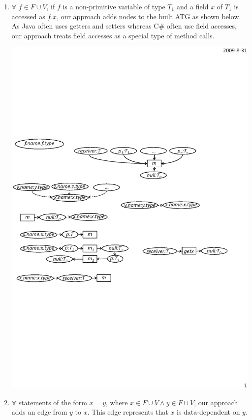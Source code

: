 \begin{enumerate}
\item $\forall$ $f\in F \cup V$, if $f$ is a non-primitive variable
of type $T_1$ and a field $x$ of $T_1$ is accessed as $f.x$, our
approach adds nodes to the built ATG as shown below. As Java often
uses getters and setters whereas C\# often use field accesses, our
approach treats field accesses as a special type of method
calls.\vspace*{-2ex}

\begin{center}
\includegraphics[scale=0.7,clip]{figure/rule3.eps}%
\end{center}\vspace*{-3ex}

\item $\forall$ statements of the form $x = y$, where $x \in F \cup V \wedge y \in F \cup V$,
our approach adds an edge from $y$ to $x$. This edge represents that
$x$ is data-dependent on $y$.\vspace*{-1.5ex}


\end{enumerate}
